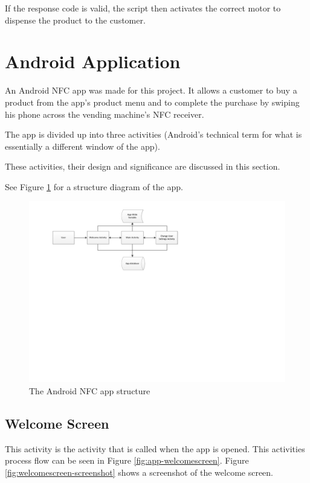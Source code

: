 If the response code is valid, the script then activates the correct motor to
dispense the product to the customer.

\section{Android Application}
\label{sec:nfc-android-app}

An Android NFC app was made for this project. It allows a customer to buy a
product from the app's product menu and to complete the purchase by swiping
his phone across the vending machine's NFC receiver.

The app is divided up into three activities (Android's technical term for what
is essentially a different window of the app). 

These activities, their design and significance are discussed in this section.

See Figure \ref{fig:nfc_app_structure} for a structure
diagram of the app.

\begin{figure}
 \centering 
 \includegraphics[clip = true, trim = 0 360 0 20,
 scale=0.7]{app_structure}
 \caption{The Android NFC app structure}
 \label{fig:nfc_app_structure}
\end{figure}

\subsection{Welcome Screen}

This activity is the activity that is called when the app is opened. This
activities process flow can be seen in Figure \ref{fig:app-welcomescreen}.
Figure \ref{fig:welcomescreen-screenshot} shows a screenshot of the welcome
screen.

